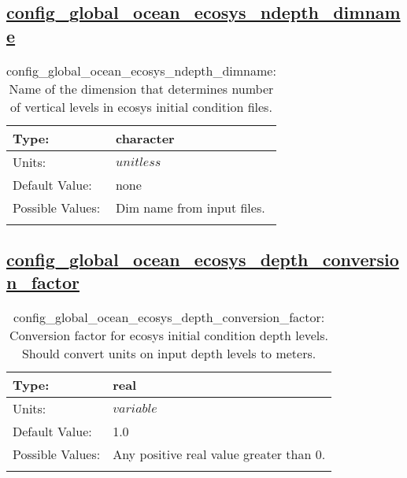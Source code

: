 \subsection[config\_global\_ocean\_ecosys\_ndepth\_dimname]{\hyperref[sec:nm_tab_global_ocean]{config\_global\_ocean\_ecosys\_ndepth\_dimname}}
\label{subsec:nm_sec_config_global_ocean_ecosys_ndepth_dimname}
\begin{center}
\begin{longtable}{| p{2.0in} || p{4.0in} |}
    \hline
    Type: & character \\
    \hline
    Units: & $unitless$ \\
    \hline
    Default Value: & none \\
    \hline
    Possible Values: & Dim name from input files. \\
    \hline
    \caption{config\_global\_ocean\_ecosys\_ndepth\_dimname: Name of the dimension that determines number of vertical levels in ecosys initial condition files.}
\end{longtable}
\end{center}
\subsection[config\_global\_ocean\_ecosys\_depth\_conversion\_factor]{\hyperref[sec:nm_tab_global_ocean]{config\_global\_ocean\_ecosys\_depth\_conversion\_factor}}
\label{subsec:nm_sec_config_global_ocean_ecosys_depth_conversion_factor}
\begin{center}
\begin{longtable}{| p{2.0in} || p{4.0in} |}
    \hline
    Type: & real \\
    \hline
    Units: & $variable$ \\
    \hline
    Default Value: & 1.0 \\
    \hline
    Possible Values: & Any positive real value greater than 0. \\
    \hline
    \caption{config\_global\_ocean\_ecosys\_depth\_conversion\_factor: Conversion factor for ecosys initial condition depth levels. Should convert units on input depth levels to meters.}
\end{longtable}
\end{center}
